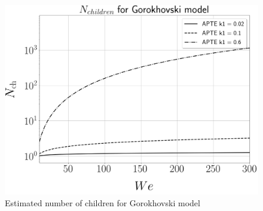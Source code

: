 \begin{figure}[h!]
	\centering
	\includegraphics[scale=0.2]{./part2_developments/figures_ch4_SLI/N_ch_gorok}
	\caption{Estimated number of children for Gorokhovski model}
	\label{fig:N_ch_gorok}
\end{figure}



%
%
%
%
%	
%
%
%
%
%
%


